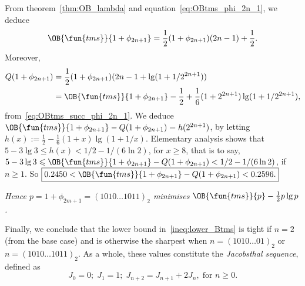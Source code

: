 \begin{itemize}
    From theorem~\ref{thm:OB_lambda} and
    equation~\eqref{eq:OBtms_phi_2n_1}, we deduce
    \begin{equation}
      \OB{\fun{tms}}{1+\phi_{2n+1}} = \frac{1}{2}(1+\phi_{2n+1})(2n - 1)
      + \frac{1}{2}.
      \label{eq:OBtms_succ_phi_2n_1}
    \end{equation}
    Moreover,
    \begin{align*}
      Q(1+\phi_{2n+1}) &= \frac{1}{2}(1+\phi_{2n+1})(2n-1 + \lg(1+1/2^{2n+1}))\\
                      &= \OB{\fun{tms}}{1+\phi_{2n+1}} - \frac{1}{2}
                         + \frac{1}{6}(1+2^{2n+1})\lg(1+1/2^{2n+1}),
    \end{align*}
    from~\eqref{eq:OBtms_succ_phi_2n_1}. We deduce
    \(\OB{\fun{tms}}{1+\phi_{2n+1}} - Q(1+\phi_{2n+1}) =
    h(2^{2n+1})\), by letting \(h(x) := \tfrac{1}{2} -
    \tfrac{1}{6}(1+x)\lg(1+1/x)\). Elementary analysis shows that \(5
    - 3\lg 3 \leqslant h(x) < 1/2 - 1/(6\ln 2)\), for \(x \geqslant
    8\), that is to say, \(5 - 3\lg 3 \leqslant
    \OB{\fun{tms}}{1+\phi_{2n+1}} - Q(1+\phi_{2n+1}) < 1/2 - 1/(6\ln
    2)\), if \(n \geqslant 1\). So \(\boxed{0.2450 <
      \smash{\OB{\fun{tms}}{1+\phi_{2n+1}}} - Q(1+\phi_{2n+1}) <
      0.2596.}\)

    \bigskip
    \textsl{Hence \(p = 1+\phi_{2m+1} = (1010\dots1011)_2\) minimises
    \(\OB{\fun{tms}}{p} - \tfrac{1}{2}p\lg p\).}

\end{itemize}
Finally, we conclude that the lower bound in~\eqref{ineq:lower_Btms}
is tight if \(n=2\) (from the base case) and is otherwise the sharpest
when \(n=(1010\dots01)_2\) or \(n=(1010\dots1011)_2\). As a whole,
these values constitute the \emph{Jacobsthal
  sequence}, defined as
\begin{equation}
J_0 = 0; \; J_1=1; \; J_{n+2} = J_{n+1} + 2J_{n},\; \text{for \(n
  \geqslant 0\).}
\label{eq:Jacobsthal}
\end{equation}

